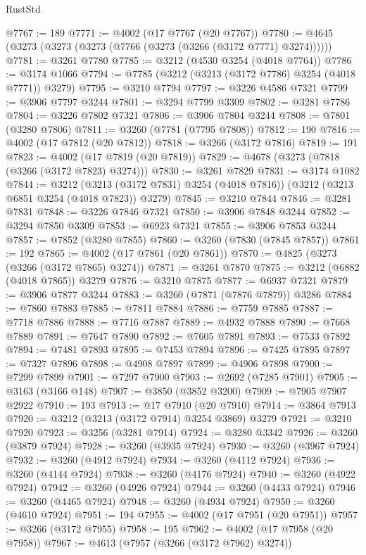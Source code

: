 \begin{lexlean}{RustStd}
\begin{coremodule}
{\begin{coremodule}
{{{{{{{{{{{{{{{{{{{{{{{{{{@7767 := 189
@7771 := @4002 (@17 @7767 (@20 @7767))
@7780 := @4645 (@3273 (@3273 (@3273 (@7766 (@3273 (@3266 (@3172 @7771) @3274))))))
@7781 := @3261 @7780
@7785 := @3212 (@4530 @3254 (@4018 @7764))
@7786 := @3174 @1066
@7794 := @7785 (@3212 (@3213 (@3172 @7786) @3254 (@4018 @7771)) @3279)
@7795 := @3210 @7794
@7797 := @3226 @4586 @7321
@7799 := @3906 @7797 @3244
@7801 := @3294 @7799 @3309
@7802 := @3281 @7786
@7804 := @3226 @7802 @7321
@7806 := @3906 @7804 @3244
@7808 := @7801 (@3280 @7806)
@7811 := @3260 (@7781 (@7795 @7808))
@7812 := 190
@7816 := @4002 (@17 @7812 (@20 @7812))
@7818 := @3266 (@3172 @7816)
@7819 := 191
@7823 := @4002 (@17 @7819 (@20 @7819))
@7829 := @4678 (@3273 (@7818 (@3266 (@3172 @7823) @3274)))
@7830 := @3261 @7829
@7831 := @3174 @1082
@7844 := @3212
    (@3213 (@3172 @7831) @3254 (@4018 @7816))
    (@3212 (@3213 @6851 @3254 (@4018 @7823)) @3279)
@7845 := @3210 @7844
@7846 := @3281 @7831
@7848 := @3226 @7846 @7321
@7850 := @3906 @7848 @3244
@7852 := @3294 @7850 @3309
@7853 := @6923 @7321
@7855 := @3906 @7853 @3244
@7857 := @7852 (@3280 @7855)
@7860 := @3260 (@7830 (@7845 @7857))
@7861 := 192
@7865 := @4002 (@17 @7861 (@20 @7861))
@7870 := @4825 (@3273 (@3266 (@3172 @7865) @3274))
@7871 := @3261 @7870
@7875 := @3212 (@6882 (@4018 @7865)) @3279
@7876 := @3210 @7875
@7877 := @6937 @7321
@7879 := @3906 @7877 @3244
@7883 := @3260 (@7871 (@7876 @7879)) @3286
@7884 := @7860 @7883
@7885 := @7811 @7884
@7886 := @7759 @7885
@7887 := @7718 @7886
@7888 := @7716 @7887
@7889 := @4932 @7888
@7890 := @7668 @7889
@7891 := @7647 @7890
@7892 := @7605 @7891
@7893 := @7533 @7892
@7894 := @7481 @7893
@7895 := @7453 @7894
@7896 := @7425 @7895
@7897 := @7327 @7896
@7898 := @4908 @7897
@7899 := @4906 @7898
@7900 := @7299 @7899
@7901 := @7297 @7900
@7903 := @2692 (@7285 @7901)
@7905 := @3163 (@3166 @148)
@7907 := @3850 (@3852 @3200)
@7909 := @7905 @7907 @2922
@7910 := 193
@7913 := @17 @7910 (@20 @7910)
@7914 := @3864 @7913
@7920 := @3212 (@3213 (@3172 @7914) @3254 @3869) @3279
@7921 := @3210 @7920
@7923 := @3256 (@3281 @7914)
@7924 := @3280 @3342
@7926 := @3260 (@3879 @7924)
@7928 := @3260 (@3935 @7924)
@7930 := @3260 (@3967 @7924)
@7932 := @3260 (@4912 @7924)
@7934 := @3260 (@4112 @7924)
@7936 := @3260 (@4144 @7924)
@7938 := @3260 (@4176 @7924)
@7940 := @3260 (@4922 @7924)
@7942 := @3260 (@4926 @7924)
@7944 := @3260 (@4433 @7924)
@7946 := @3260 (@4465 @7924)
@7948 := @3260 (@4934 @7924)
@7950 := @3260 (@4610 @7924)
@7951 := 194
@7955 := @4002 (@17 @7951 (@20 @7951))
@7957 := @3266 (@3172 @7955)
@7958 := 195
@7962 := @4002 (@17 @7958 (@20 @7958))
@7967 := @4613 (@7957 (@3266 (@3172 @7962) @3274))
}}}}}}}}}}}}}}}}}}}}}}}}}}
\end{coremodule}}
\end{coremodule}
\end{lexlean}
